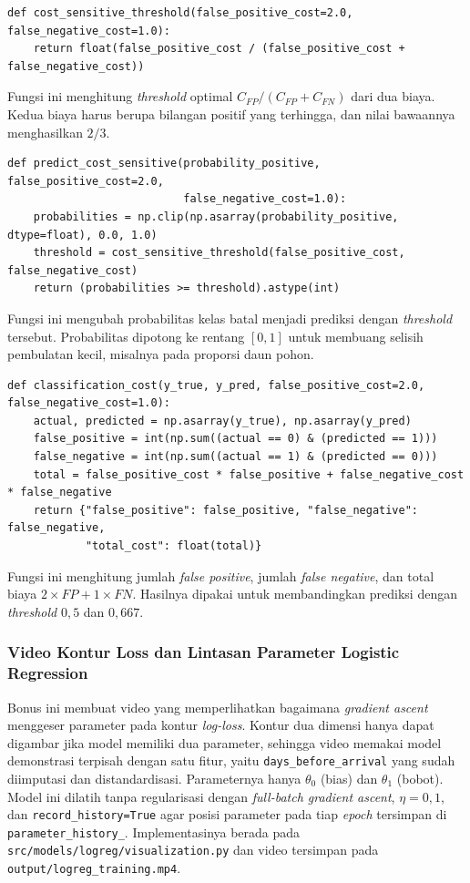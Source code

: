 \begin{lstlisting}
def cost_sensitive_threshold(false_positive_cost=2.0, false_negative_cost=1.0):
    return float(false_positive_cost / (false_positive_cost + false_negative_cost))
\end{lstlisting}

Fungsi ini menghitung \textit{threshold} optimal $C_{FP}/(C_{FP}+C_{FN})$ dari
dua biaya. Kedua biaya harus berupa bilangan positif yang terhingga, dan nilai
bawaannya menghasilkan $2/3$.

\begin{lstlisting}
def predict_cost_sensitive(probability_positive, false_positive_cost=2.0,
                           false_negative_cost=1.0):
    probabilities = np.clip(np.asarray(probability_positive, dtype=float), 0.0, 1.0)
    threshold = cost_sensitive_threshold(false_positive_cost, false_negative_cost)
    return (probabilities >= threshold).astype(int)
\end{lstlisting}

Fungsi ini mengubah probabilitas kelas batal menjadi prediksi dengan
\textit{threshold} tersebut. Probabilitas dipotong ke rentang $[0,1]$ untuk
membuang selisih pembulatan kecil, misalnya pada proporsi daun pohon.

\begin{lstlisting}
def classification_cost(y_true, y_pred, false_positive_cost=2.0, false_negative_cost=1.0):
    actual, predicted = np.asarray(y_true), np.asarray(y_pred)
    false_positive = int(np.sum((actual == 0) & (predicted == 1)))
    false_negative = int(np.sum((actual == 1) & (predicted == 0)))
    total = false_positive_cost * false_positive + false_negative_cost * false_negative
    return {"false_positive": false_positive, "false_negative": false_negative,
            "total_cost": float(total)}
\end{lstlisting}

Fungsi ini menghitung jumlah \textit{false positive}, jumlah \textit{false
negative}, dan total biaya $2\times FP+1\times FN$. Hasilnya dipakai untuk
membandingkan prediksi dengan \textit{threshold} $0{,}5$ dan $0{,}667$.

\subsubsection{Video Kontur Loss dan Lintasan Parameter Logistic Regression}

Bonus ini membuat video yang memperlihatkan bagaimana \textit{gradient ascent}
menggeser parameter pada kontur \textit{log-loss}. Kontur dua dimensi hanya
dapat digambar jika model memiliki dua parameter, sehingga video memakai model
demonstrasi terpisah dengan satu fitur, yaitu \texttt{days\_before\_arrival}
yang sudah diimputasi dan distandardisasi. Parameternya hanya $\theta_0$ (bias)
dan $\theta_1$ (bobot). Model ini dilatih tanpa regularisasi dengan
\textit{full-batch gradient ascent}, $\eta=0{,}1$, dan
\texttt{record\_history=True} agar posisi parameter pada tiap \textit{epoch}
tersimpan di \texttt{parameter\_history\_}. Implementasinya berada pada
\texttt{src/models/logreg/visualization.py} dan video tersimpan pada
\texttt{output/logreg\_training.mp4}.

